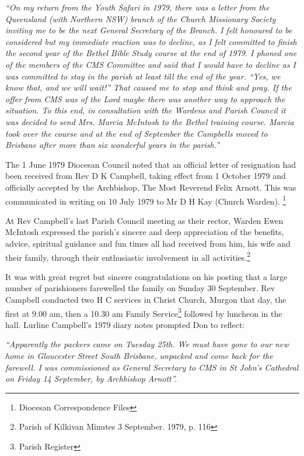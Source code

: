 \emph{``On my return from the Youth Safari in 1979, there was a letter from the Queensland (with Northern NSW) branch of the Church Missionary Society inviting me to be the next General Secretary of the Branch. I felt honoured to be considered but my immediate reaction was to decline, as I felt committed to finish the second year of the Bethel Bible Study course at the end of 1979. I phoned one of the members of the CMS Committee and said that I would have to decline as I was committed to stay in the parish at least till the end of the year. ``Yes, we know that, and we will wait!'' That caused me to stop and think and pray. If the offer from CMS was of the Lord maybe there was another way to approach the situation. To this end, in consultation with the Wardens and Parish Council it was decided to send Mrs. Marcia McIntosh to the Bethel training course. Marcia took over the course and at the end of September the Campbells moved to Brisbane after more than six wonderful years in the parish.''}



The 1 June 1979 Diocesan Council noted that an official letter of resignation had been received from Rev D K Campbell, taking effect from 1 October 1979 and officially accepted by the Archbishop, The Most Reverend Felix Arnott. This was communicated in writing on 10 July 1979 to Mr D H Kay (Church Warden). \footnote{Diocesan Correspondence Files}


At Rev Campbell's last Parish Council meeting as their rector, Warden Ewen McIntosh expressed the parish's sincere and deep appreciation of the benefits, advice, spiritual guidance and fun times all had received from him, his wife and their family, through their enthusiastic involvement in all activities.\footnote{Parish of Kilkivan Minutes 3 September. 1979, p. 116}


It was with great regret but sincere congratulations on his posting that a large number of parishioners farewelled the family on Sunday 30 September. Rev Campbell conducted two H C services in Christ Church, Murgon that day, the first at 9.00 am, then a 10.30 am Family Service\footnote{Parish Register} followed by luncheon in the hall. Lurline Campbell's 1979 diary notes prompted Don to reflect:


\emph{``Apparently the packers came on Tuesday 25th. We must have gone to our new home in Gloucester Street South Brisbane, unpacked and come back for the farewell. I was commissioned as General Secretary to CMS in St John's Cathedral on Friday 14 September, by Archbishop Arnott''.}



